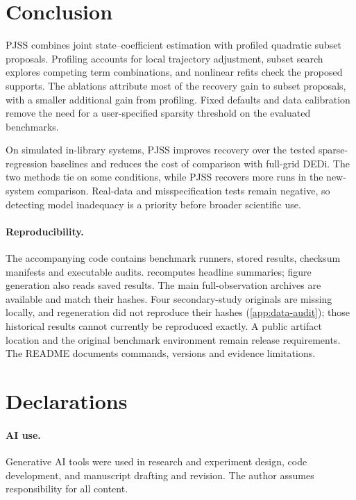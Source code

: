 \section{Conclusion}
\label{sec:conclusion}

PJSS combines joint state--coefficient estimation with profiled quadratic subset proposals. Profiling accounts for local trajectory adjustment, subset search explores competing term combinations, and nonlinear refits check the proposed supports. The ablations attribute most of the recovery gain to subset proposals, with a smaller additional gain from profiling. Fixed defaults and data calibration remove the need for a user-specified sparsity threshold on the evaluated benchmarks.

On simulated in-library systems, PJSS improves recovery over the tested sparse-regression baselines and reduces the cost of comparison with full-grid DEDi. The two methods tie on some conditions, while PJSS recovers more runs in the new-system comparison. Real-data and misspecification tests remain negative, so detecting model inadequacy is a priority before broader scientific use.

\paragraph{Reproducibility.} The accompanying code contains benchmark runners, stored results, checksum manifests and executable audits.  recomputes headline summaries; figure generation also reads saved results. The main full-observation archives are available and match their hashes. Four secondary-study originals are missing locally, and regeneration did not reproduce their hashes (\cref{app:data-audit}); those historical results cannot currently be reproduced exactly. A public artifact location and the original benchmark environment remain release requirements. The README documents commands, versions and evidence limitations.

\section*{Declarations}\paragraph{AI use.} Generative AI tools were used in research and experiment design, code development, and manuscript drafting and revision. The author assumes responsibility for all content.
